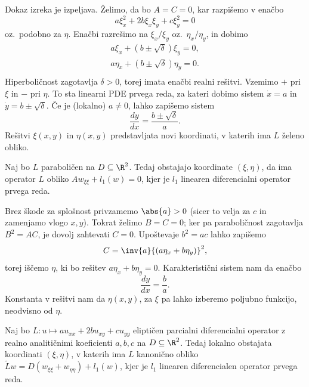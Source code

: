 Dokaz izreka je izpeljava.
Želimo, da bo $A = C = 0$, kar razpišemo v enačbo
\[
  a \xi_x^2 + 2b \xi_x \xi_y + c \xi_y^2 = 0
\]
oz.~podobno za $\eta$.
Enačbi razrešimo na $\xi_x / \xi_y$ oz.~$\eta_x / \eta_y$, in dobimo
\begin{gather*}
  a \xi_x + (b \pm \sqrt{\delta}) \xi_y = 0, \\
  a \eta_x + (b \pm \sqrt{\delta}) \eta_y = 0. \\
\end{gather*}
Hiperboličnost zagotavlja $\delta > 0$, torej imata enačbi realni rešitvi.
Vzemimo $+$ pri $\xi$ in $-$ pri $\eta$.
To sta linearni PDE prvega reda, za kateri dobimo sistem $\dot{x} = a$ in
$\dot{y} = b \pm \sqrt{\delta}$.
Če je (lokalno) $a \ne 0$, lahko zapišemo sistem
\[
  \frac{dy}{dx} = \frac{b \pm \sqrt{\delta}}{a}.
\]
Rešitvi $\xi(x,y)$ in $\eta(x,y)$ predstavljata novi koordinati, v katerih ima
$L$ želeno obliko.


\begin{izrek}
  Naj bo $L$ paraboličen na $D \subseteq \R^2$.
  Tedaj obstajajo koordinate $(\xi, \eta)$, da ima operator $L$ obliko $A w_{\xi
  \xi} + l_1(w) = 0$, kjer je $l_1$ linearen diferencialni operator prvega reda.
\end{izrek}

Brez škode za splošnost privzamemo $\abs{a} > 0$ (sicer to velja za $c$ in
zamenjamo vlogo $x, y$).
Tokrat želimo $B = C = 0$; ker pa paraboličnost zagotavlja $B^2 = AC$, je dovolj
zahtevati $C = 0$.
Upoštevaje $b^2 = ac$ lahko zapišemo
\[
  C = \inv{a} {(a \eta_x + b \eta_y)}^2,
\]
torej iščemo $\eta$, ki bo rešitev $a \eta_x + b \eta_y = 0$.
Karakteristični sistem nam da enačbo
\[
  \frac{dy}{dx} = \frac{b}{a}.
\]
Konstanta v rešitvi nam da $\eta(x,y)$, za $\xi$ pa lahko izberemo poljubno
funkcijo, neodvisno od $\eta$.


\begin{izrek}
  Naj bo $L: u \mapsto a u_{xx} + 2b u_{xy} + c u_{yy}$ eliptičen parcialni
  diferencialni operator z realno analitičnimi koeficienti $a, b, c$ na $D
  \subseteq \R^2$.
  Tedaj lokalno obstajata koordinati $(\xi, \eta)$, v katerih ima $L$ kanonično
  obliko $\tilde{L} w = D(w_{\xi \xi} + w_{\eta \eta}) + l_1(w)$, kjer je $l_1$
  linearen diferencialen operator prvega reda.
\end{izrek}

